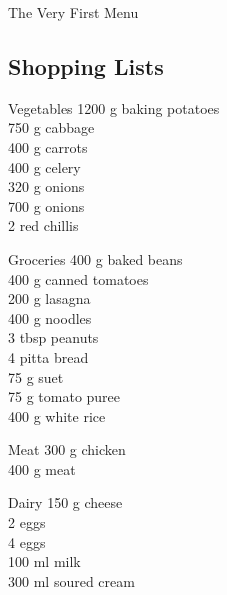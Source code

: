 
    
		\begin{menu}{The Very First Menu}
    
    \subsection*{Shopping Lists}
      \begin{shoppinglist}{Vegetables}
      1200 g baking potatoes \\ 
      750 g cabbage \\ 
      400 g carrots \\ 
      400 g celery \\ 
      320 g onions \\ 
      700 g onions \\ 
      2  red chillis \\ 
      \end{shoppinglist}%
      \begin{shoppinglist}{Groceries}
      400 g baked beans \\ 
      400 g canned tomatoes \\ 
      200 g lasagna \\ 
      400 g noodles \\ 
      3 tbsp peanuts \\ 
      4  pitta bread \\ 
      75 g suet \\ 
      75 g tomato puree \\ 
      400 g white rice \\ 
      \end{shoppinglist}%
      \par\vfil %
      \begin{shoppinglist}{Meat}
      300 g chicken \\ 
      400 g meat \\ 
      \end{shoppinglist}%
      \begin{shoppinglist}{Dairy}
      150 g cheese \\ 
      2  eggs \\ 
      4  eggs \\ 
      100 ml milk \\ 
      300 ml soured cream \\ 
      \end{shoppinglist}%

\end{menu}
